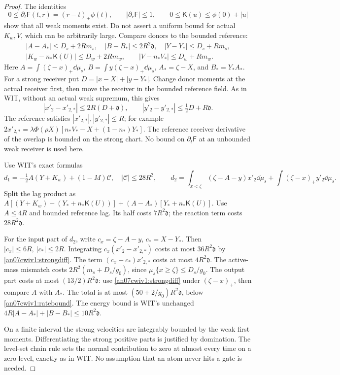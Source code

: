 \documentclass[11pt]{article}
\numberwithin{equation}{section}
\theoremstyle{remark}\newtheorem{remark}[theorem]{Remark}
\newcommand{\Kfun}{\mathsf K}\newcommand{\Ffun}{\mathsf F}
\newcommand{\dist}{\mathfrak d}
\begin{document}
\begin{proof}
The identities
\[
 0\le\partial_t\Ffun(t,r)=(r-t)_+\phi(t),\qquad
 |\partial_r\Ffun|\le1,\qquad
 0\le\Kfun(u)\le\phi(0)+|u|
 \]
show that all weak moments exist. Do not assert a uniform
bound for actual \(K_w,V\), which can be arbitrarily large.
Compare donors to the bounded reference:
\begin{gather*}
 |A-A_*|\le D_s+2Rm_s,\quad
 |B-B_*|\le2R^2\dist,\quad |Y-Y_*|\le D_s+Rm_s,\\
 |K_w-n_*\Kfun(U)|\le D_w+2Rm_w,\qquad
 |V-n_*V_*|\le D_w+Rm_w .
\end{gather*}
Here \(A=\int(\zeta-x)_+\dd\mu_s,\ B=\int y(\zeta-x)_+\dd\mu_s\),
\(A_*=\zeta-X\), and \(B_*=Y_*A_*\).
For a strong receiver put \(D=|x-X|+|y-Y_*|\).
Change donor moments at the actual receiver first, then move
the receiver in the bounded reference field. As in WIT,
without an actual weak supremum, this gives
\begin{equation}
 |x'_2-x'_{2,*}|\le2R(D+\dist),\qquad
 |y'_2-y'_{2,*}|\le\tfrac12D+R\dist.
 \label{an07cwiv1:strongdiff}
\end{equation}
The reference satisfies \(|x'_{2,*}|,|y'_{2,*}|\le R\);
for example
\(2x'_{2,*}=\lambda\Phi(\rho X)
[n_*V_*-X+(1-n_*)Y_*]\).
The reference receiver derivative of the overlap is bounded
on the strong chart. No bound on \(\partial_t\Ffun\) at an
unbounded weak receiver is used here.

Use WIT's exact formulas
\[
 d_1=-\tfrac12A(Y+K_w)+(1-M)\mathcal C,\quad
 |\mathcal C|\le28R^2,\qquad
 d_2=\int_{x<\zeta}(\zeta-A-y)x'_2\dd\mu_s
       +\int(\zeta-x)_+y'_2\dd\mu_s .
 \]
Split the lag product as
\(A[(Y+K_w)-(Y_*+n_*\Kfun(U))]
 +(A-A_*)[Y_*+n_*\Kfun(U)]\).
Use \(A\le4R\) and bounded reference lag. Its half costs
\(7R^2\dist\); the reaction term costs \(28R^2\dist\).

For the input part of \(d_2\), write \(c_x=\zeta-A-y\),
\(c_*=X-Y_*\). Then \(|c_x|\le6R,\ |c_*|\le2R\).
Integrating \(c_x(x'_2-x'_{2,*})\) costs at most
\(36R^2\dist\) by \eqref{an07cwiv1:strongdiff}.
The term \((c_x-c_*)x'_{2,*}\) costs at most \(4R^2\dist\).
The active-mass mismatch costs
\(2R^2(m_s+D_s/g_0)\), since
\(\mu_s\{x\ge\zeta\}\le D_s/g_0\).
The output part costs at most \((13/2)R^2\dist\):
use \eqref{an07cwiv1:strongdiff} under
\((\zeta-x)_+\), then compare \(A\) with \(A_*\).
The total is at most \((50+2/g_0)R^2\dist\), below
\eqref{an07cwiv1:ratebound}.
The energy bound is WIT's unchanged
\(4R|A-A_*|+|B-B_*|\le10R^2\dist\).

On a finite interval the strong velocities are integrably
bounded by the weak first moments. Differentiating the strong
positive parts is justified by domination. The level-set chain
rule sets the normal contribution to zero at almost every time
on a zero level, exactly as in WIT. No assumption that an atom
never hits a gate is needed.
\end{proof}
\end{document}
